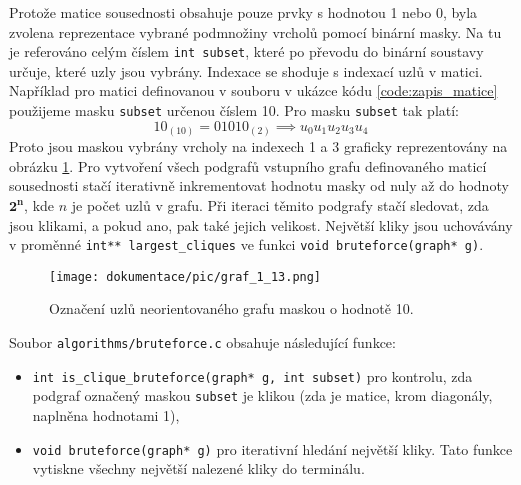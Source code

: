 \documentclass[a4paper]{article}
\begin{document}
        \noindent
        Protože matice sousednosti obsahuje pouze prvky s hodnotou 1 nebo 0, byla zvolena reprezentace vybrané podmnožiny vrcholů pomocí binární masky. Na tu je referováno celým číslem \lstinline{int subset}, které po převodu do binární soustavy určuje, které uzly jsou vybrány. Indexace se shoduje s indexací uzlů v matici.\\

        \noindent
        Například pro matici definovanou v souboru v ukázce kódu \ref{code:zapis_matice} použijeme masku \lstinline{subset} určenou číslem 10. Pro masku \lstinline{subset} tak platí:
        \begin{equation}
            10_{(10)} = 01010_{(2)} \implies u_{0}u_{1}u_{2}u_{3}u_{4}
        \end{equation}
        \noindent
        Proto jsou maskou vybrány vrcholy na indexech 1 a 3 graficky reprezentovány na obrázku \ref{fig:graf_maska}. Pro vytvoření všech podgrafů vstupního grafu definovaného maticí sousednosti stačí iterativně inkrementovat hodnotu masky od nuly až do hodnoty $\mathbf{2^{n}}$, kde $n$ je počet uzlů v grafu. Při iteraci těmito podgrafy stačí sledovat, zda jsou klikami, a pokud ano, pak také jejich velikost. Největší kliky jsou uchovávány v proměnné \lstinline{int** largest_cliques} ve funkci \lstinline{void bruteforce(graph* g)}.\\
        
        \begin{figure}[th]
            \centering
            \texttt{[image: dokumentace/pic/graf\_1\_13.png]}
            \caption{Označení uzlů neorientovaného grafu maskou o hodnotě 10.}
            \label{fig:graf_maska}
        \end{figure}

        \noindent
        Soubor \lstinline{algorithms/bruteforce.c} obsahuje následující funkce:
        \begin{itemize}
            \item \lstinline{int is_clique_bruteforce(graph* g, int subset)} pro kontrolu, zda podgraf označený maskou \lstinline{subset} je klikou (zda je matice, krom diagonály, naplněna hodnotami 1),
            \item \lstinline{void bruteforce(graph* g)} pro iterativní hledání největší kliky. Tato funkce vytiskne všechny největší nalezené kliky do terminálu.
        \end{itemize}
\end{document}
